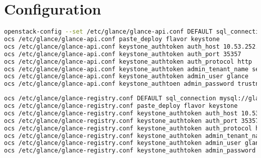 \documentclass[11pt,letterpaper,oneside]{book}
\begin{document}
\section{Configuration}
\begin{lstlisting}[caption={Glance API},language=bash]
openstack-config --set /etc/glance/glance-api.conf DEFAULT sql_connection mysql://glance:trustn01@10.53.252.61/glance
ocs /etc/glance/glance-api.conf paste_deploy flavor keystone
ocs /etc/glance/glance-api.conf keystone_authtoken auth_host 10.53.252.61
ocs /etc/glance/glance-api.conf keystone_authtoken auth_port 35357
ocs /etc/glance/glance-api.conf keystone_authtoken auth_protocol http
ocs /etc/glance/glance-api.conf keystone_authtoken admin_tenant_name service
ocs /etc/glance/glance-api.conf keystone_authtoken admin_user glance
ocs /etc/glance/glance-api.conf keystone_authtoen admin_password trustn01
\end{lstlisting}

\begin{lstlisting}[caption={Glance Registry},language=bash]
ocs /etc/glance/glance-registry.conf DEFAULT sql_connection mysql://glance:trustn01@10.53.252.61/glance
ocs /etc/glance/glance-registry.conf paste_deploy flavor keystone
ocs /etc/glance/glance-registry.conf keystone_authtoken auth_host 10.53.252.61
ocs /etc/glance/glance-registry.conf keystone_authtoken auth_port 35357
ocs /etc/glance/glance-registry.conf keystone_authtoken auth_protocol http
ocs /etc/glance/glance-registry.conf keystone_authtoken admin_tenant_name service
ocs /etc/glance/glance-registry.conf keystone_authtoken admin_user glance
ocs /etc/glance/glance-registry.conf keystone_authtoken admin_password trustn01
\end{lstlisting}
\end{document}
